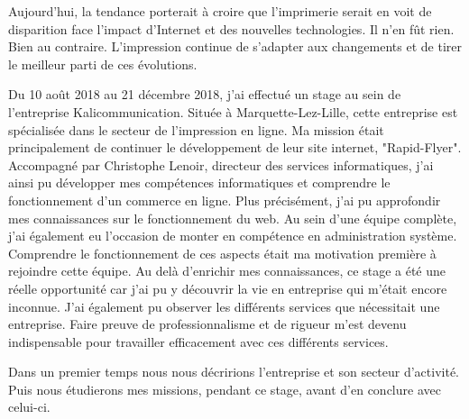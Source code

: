 Aujourd'hui, la tendance porterait à croire que l'imprimerie serait en voit de disparition face l'impact d'Internet et des nouvelles technologies. Il n'en fût rien. Bien au contraire. L'impression continue de s'adapter aux changements et de tirer le meilleur parti de ces évolutions.\newline

Du 10 août 2018 au 21 décembre 2018, j'ai effectué un stage au sein de l'entreprise Kalicommunication.
Située à Marquette-Lez-Lille, cette entreprise est spécialisée dans le secteur de l'impression en ligne.\newline
Ma mission était principalement de continuer le développement de leur site internet, "Rapid-Flyer".
Accompagné par Christophe Lenoir, directeur des services informatiques, j'ai ainsi pu développer mes compétences informatiques et comprendre le fonctionnement d'un commerce en ligne. Plus précisément, j'ai pu approfondir mes connaissances sur le fonctionnement du web. Au sein d'une équipe complète, j'ai également eu l'occasion de monter en compétence en administration système. Comprendre le fonctionnement de ces aspects était ma motivation première à rejoindre cette équipe.\newline
Au delà d'enrichir mes connaissances, ce stage a été une réelle opportunité car j'ai pu y découvrir la vie en entreprise qui m'était encore inconnue. J'ai également pu observer les différents services que nécessitait une entreprise. Faire preuve de professionnalisme et de rigueur m'est devenu indispensable pour travailler efficacement avec ces différents services.\newline

Dans un premier temps nous nous décririons l'entreprise et son secteur d'activité. Puis nous étudierons mes missions, pendant ce stage, avant d'en conclure avec celui-ci.